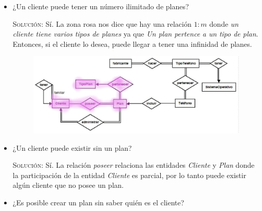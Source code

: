 \documentclass[letterpaper,11pt]{article}
\begin{document}
    \begin{itemize}
        \item ¿Un cliente puede tener un número ilimitado de planes?

    \textsc{Solución:} Sí. La zona rosa nos dice que hay una relación $1:m$ 
    donde \textit{un cliente tiene varios tipos de planes} ya que 
    \textit{Un plan pertence a un tipo de plan}. Entonces, si el 
    cliente lo desea, puede llegar a tener una infinidad de planes.

    \begin{figure}[h]
        \centering
        \includegraphics[scale=0.4]{./imagenes/modelo1.jpg}
    \end{figure}

    \item ¿Un cliente puede existir sin un plan?

    \textsc{Solución:} Sí. La relación \textit{poseer} relaciona las entidades \textit{Cliente} y \textit{Plan} donde la participación de la entidad \textit{Cliente} es parcial, por lo tanto puede existir algún cliente que no posee un plan.

    \item ¿Es posible crear un plan sin saber quién es el cliente?


\end{itemize}
\end{document}
